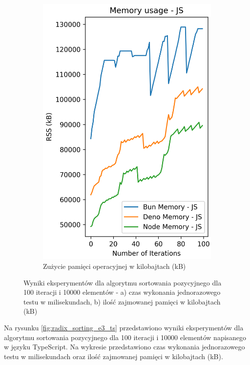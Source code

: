 \begin{figure}[H]
\begin{subfigure}[b]{0.4\textwidth}
    \includegraphics[width=\textwidth]{Figures/sorting/sorting_radix_100_10000_js_memory.png}
    \caption{Zużycie pamięci operacyjnej w kilobajtach (kB)}
    \label{fig:radix_sorting_e3_memory}
  \end{subfigure}
  \caption{Wyniki eksperymentów dla algorytmu sortowania pozycyjnego dla 100 iteracji i 10000 elementów - a) czas wykonania jednorazowego testu w milisekundach, b) ilość zajmowanej pamięci w kilobajtach (kB)}
  \label{fig:radix_sorting_e3}
\end{figure}

Na rysunku \ref{fig:radix_sorting_e3_ts} przedstawiono wyniki eksperymentów dla algorytmu sortowania pozycyjnego dla 100 iteracji i 10000 elementów napisanego w języku TypeScript. Na wykresie przedstawiono czas wykonania jednorazowego testu w milisekundach oraz ilość zajmowanej pamięci w kilobajtach (kB).


